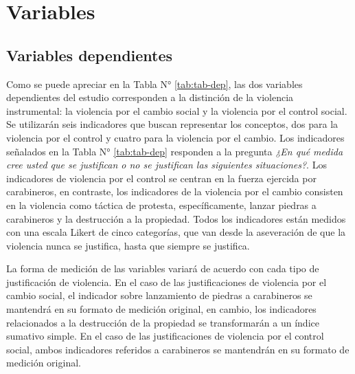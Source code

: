 \documentclass[12pt,twoside]{templates/facsothesis}
\begin{document}
\hypertarget{variables}{%
\section{Variables}\label{variables}}

\hypertarget{variables-dependientes}{%
\subsection{Variables dependientes}\label{variables-dependientes}}

Como se puede apreciar en la Tabla N° \ref{tab:tab-dep}, las dos variables dependientes del estudio corresponden a la distinción de la violencia instrumental: la violencia por el cambio social y la violencia por el control social. Se utilizarán seis indicadores que buscan representar los conceptos, dos para la violencia por el control y cuatro para la violencia por el cambio. Los indicadores señalados en la Tabla N° \ref{tab:tab-dep} responden a la pregunta \emph{¿En qué medida cree usted que se justifican o no se justifican las siguientes situaciones?}. Los indicadores de violencia por el control se centran en la fuerza ejercida por carabineros, en contraste, los indicadores de la violencia por el cambio consisten en la violencia como táctica de protesta, específicamente, lanzar piedras a carabineros y la destrucción a la propiedad. Todos los indicadores están medidos con una escala Likert de cinco categorías, que van desde la aseveración de que la violencia nunca se justifica, hasta que siempre se justifica.

La forma de medición de las variables variará de acuerdo con cada tipo de justificación de violencia. En el caso de las justificaciones de violencia por el cambio social, el indicador sobre lanzamiento de piedras a carabineros se mantendrá en su formato de medición original, en cambio, los indicadores relacionados a la destrucción de la propiedad se transformarán a un índice sumativo simple. En el caso de las justificaciones de violencia por el control social, ambos indicadores referidos a carabineros se mantendrán en su formato de medición original.
\end{document}
